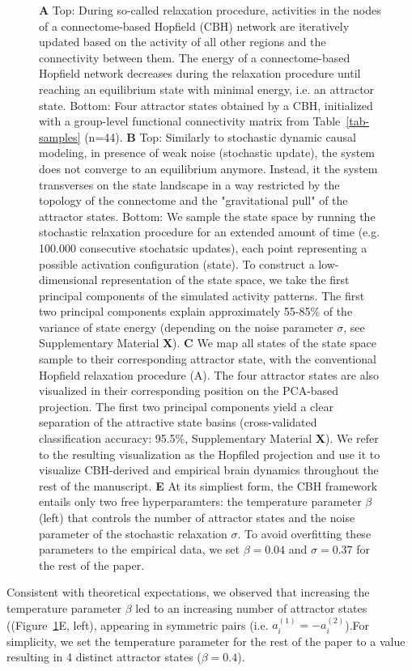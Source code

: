 \documentclass{article}
\begin{document}
\begin{figure}[!htbp]
{\textbf{A} Top: During so-called relaxation procedure, activities in the nodes of a connectome-based Hopfield (CBH) network
are iteratively updated based on the activity of all other regions and the connectivity between them. The energy of a
connectome-based Hopfield network decreases during the relaxation procedure until reaching an equilibrium state with
minimal energy, i.e. an attractor state. Bottom: Four attractor states obtained by a CBH, initialized with a
group-level functional connectivity matrix from Table~\ref{tab-samples} (n=44).
\textbf{B} Top: Similarly to stochastic dynamic causal modeling, in presence of weak noise (stochastic update), the system
does not converge to an equilibrium anymore. Instead, it the system transverses on the state landscape in a way
restricted by the topology of the connectome and the "gravitational pull" of the attractor states. Bottom: We sample
the state space by running the stochastic relaxation procedure for an extended amount of time (e.g. 100.000 consecutive
stochatsic updates), each point representing a possible activation configuration (state). To construct a
low-dimensional representation of the state space, we take the first principal components of the simulated activity
patterns. The first two principal components explain approximately 55-85\% of the variance of state energy (depending
on the noise parameter $\sigma$, see Supplementary Material \textbf{X}).
\textbf{C} We map all states of the state space sample to their corresponding attractor state, with the conventional
Hopfield relaxation procedure (A). The four attractor states are also visualized in their corresponding position on the
PCA-based projection. The first two principal components yield a clear separation of the attractive state basins
(cross-validated classification accuracy: 95.5\%, Supplementary Material \textbf{X}). We refer to the resulting visualization
as the Hopfiled projection and use it to visualize CBH-derived and empirical brain dynamics throughout the rest of
the manuscript.
\textbf{E} At its simpliest form, the CBH framework entails only two free hyperparamters: the temperature parameter
$\beta$ (left) that controls the number of attractor states and the noise parameter of the stochastic relaxation
$\sigma$. To avoid overfitting these parameters to the empirical data, we set $\beta=0.04$ and $\sigma=0.37$ for the
rest of the paper.}
\label{attractors}
\end{figure}

Consistent with theoretical expectations, we observed that increasing the temperature parameter $\beta$ led to an
increasing number of attractor states ((Figure~\ref{attractors}E, left), appearing in symmetric pairs
(i.e. $a_i^{(1)} = -a_i^{(2)}$).For simplicity, we set the temperature parameter for the rest of the paper to a value
resulting in 4 distinct attractor states ($\beta=0.4$).
\end{document}

